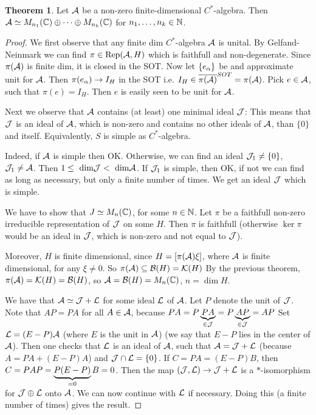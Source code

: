 \documentclass[10pt,english,a4paper]{article}
\theoremstyle{definition}
\newtheorem*{theorem}{Theorem}
\DeclareMathOperator{\Rep}{Rep}
\begin{document}
\begin{theorem}
    Let $\mathcal{A}$ be a non-zero finite-dimensional $C^*$-algebra. Then $\mathcal{A} \simeq M_{n_1}(\mathbb{C})\oplus 
\cdots \oplus M_{n_k}(\mathbb{C})$ for $n_1,\ldots, n_k \in \mathbb{N}$.
\end{theorem}
\begin{proof}
    We first observe that any finite dim $C^*$-algebra $\mathcal{A}$ is unital. 
By Gelfand-Neinmark we can find $\pi \in \Rep(\As,H)$ which is faithfull and non-degenerate. 
Since $\pi(\mathcal{A})$ is finite dim, it is closed in the SOT. Now let $\{e_{\alpha}\}$ be 
and approximate unit for $\mathcal{A}$. Then $\pi(e_{\alpha}) \to I_H$ in the SOT i.e.
$I_H \in \overline{\pi(\mathcal{A})}^{SOT} = \pi(\mathcal{A})$. Pick $e \in \mathcal{A}$, such that $\pi(e) = I_H$.
Then $e$ is easily seen to be unit for $\mathcal{A}$.

Next we observe that $\mathcal{A}$ contains (at least) one minimal ideal $\mathcal{J}$: This
means that $\mathcal{J}$ is an ideal of $\mathcal{A}$, which is non-zero and contains no other
ideals of $\mathcal{A}$, than $\{0\}$ and itself. Equivalently, $S$ is simple  as
$C^*$-algebra. 

Indeed, if $\mathcal{A}$ is simple then OK. Otherwise, we can find an ideal $\mathcal{J}_1\neq\{0\}$,
$\mathcal{J}_1 \neq \mathcal{A}$. Then $1\leq \text{ dim} \mathcal{J} < \text{ dim} \mathcal{A}$. If $\mathcal{J}_1$ is simple, then OK,
if not we can find as long as necessary, but only a finite number of times. We get an ideal $\mathcal{J}$
which is simple. 

We have to show that $J \simeq M_{n}(\mathbb{C})$, for some $n\in \mathbb{N}$. Let $\pi$
be a faithfull non-zero irreducible representation of $\mathcal{J}$ on some $H$.
Then $\pi$ is faithfull (otherwise $\ker \pi$ would be an ideal in $\mathcal{J}$, which is non-zero
and not equal to $\mathcal{J}$).

Moreover, $H$ is finite dimensional, since $H = [\pi(\mathcal{A})\xi]$, where $\mathcal{A}$ is finite dimensional,
for any $\xi \neq 0$.
So $\pi(\mathcal{A})\subseteq \mathcal{B}(H) = \mathcal{K}(H)$
By the previous theorem, $\pi(\mathcal{A}) = \mathcal{K}(H) = \mathcal{B}(H)$, so $\mathcal{A} = \mathcal{B}(H) = M_n(\mathbb{C})$, 
$n = \dim H$.

We have that $\mathcal{A} \simeq \mathcal{J} +\mathcal{L}$ for some ideal $\mathcal{L}$ of $\mathcal{A}$.
Let $P$ denote the unit of $\mathcal{J}$. Note that $AP =PA$ for all $A \in \mathcal{A}$,
because $PA=P\underbrace{PA}_{\in \mathcal{J}} = P\underbrace{AP}_{\in \mathcal{J}} = AP$
Set $\mathcal{L} = (E-P)\mathcal{A}$ (where $E$ is the unit in $\mathcal{A}$) (we say that $E-P$ lies
in the center of $\mathcal{A}$).
Then one checks that $\mathcal{L}$ is an ideal of $\mathcal{A}$, such that $\mathcal{A} = \mathcal{J} + \mathcal{L}$ 
(because $A = PA + (E-P)A$) and $\mathcal{J}\cap \mathcal{L} = \{0\}$.
If $C = PA = (E-P)B$, then $C = PAP = \underbrace{P(E-P)}_{=0}B = 0$. 
Then the map $(\mathcal{J},\mathcal{L})\to \mathcal{J} + \mathcal{L}$ is a $*$-isomorphism for $\mathcal{J} \oplus \mathcal{L}$ 
onto $\mathcal{A}$. 
We can now continue with $\mathcal{L}$ if necessary. Doing this (a finite number of times)
gives the result.


\end{proof}
\end{document}
